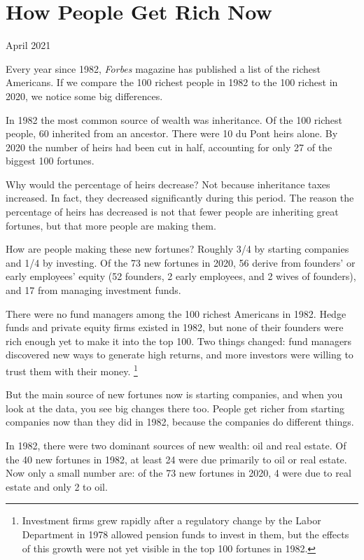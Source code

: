 \chapter{How People Get Rich Now}

April 2021

Every year since 1982, \emph{Forbes} magazine has published a list of
the richest Americans. If we compare the 100 richest people in 1982 to
the 100 richest in 2020, we notice some big differences.

In 1982 the most common source of wealth was inheritance. Of the 100
richest people, 60 inherited from an ancestor. There were 10 du Pont
heirs alone. By 2020 the number of heirs had been cut in half,
accounting for only 27 of the biggest 100 fortunes.

Why would the percentage of heirs decrease? Not because inheritance
taxes increased. In fact, they decreased significantly during this
period. The reason the percentage of heirs has decreased is not that
fewer people are inheriting great fortunes, but that more people are
making them.

How are people making these new fortunes? Roughly 3/4 by starting
companies and 1/4 by investing. Of the 73 new fortunes in 2020, 56
derive from founders' or early employees' equity (52 founders, 2 early
employees, and 2 wives of founders), and 17 from managing investment
funds.

There were no fund managers among the 100 richest Americans in 1982.
Hedge funds and private equity firms existed in 1982, but none of their
founders were rich enough yet to make it into the top 100. Two things
changed: fund managers discovered new ways to generate high returns, and
more investors were willing to trust them with their money.
\footnote{Investment firms grew rapidly after a regulatory change by the
Labor Department in 1978 allowed pension funds to invest in them, but
the effects of this growth were not yet visible in the top 100 fortunes
in 1982.}

But the main source of new fortunes now is starting companies, and when
you look at the data, you see big changes there too. People get richer
from starting companies now than they did in 1982, because the companies
do different things.

In 1982, there were two dominant sources of new wealth: oil and real
estate. Of the 40 new fortunes in 1982, at least 24 were due primarily
to oil or real estate. Now only a small number are: of the 73 new
fortunes in 2020, 4 were due to real estate and only 2 to oil.


